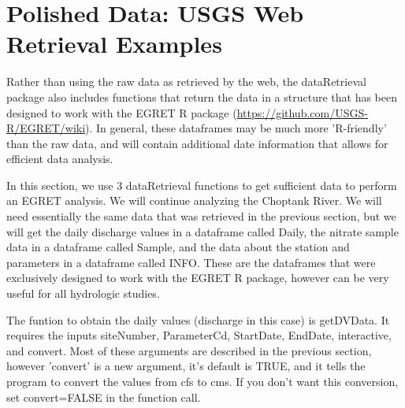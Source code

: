 \documentclass[a4paper,11pt]{article}
\begin{document}
\section{Polished Data: USGS Web Retrieval Examples}
Rather than using the raw data as retrieved by the web, the dataRetrieval package also includes functions that return the data in a structure that has been designed to work with the EGRET R package (\url{https://github.com/USGS-R/EGRET/wiki}). In general, these dataframes may be much more 'R-friendly' than the raw data, and will contain additional date information that allows for efficient data analysis.

In this section, we use 3 dataRetrieval functions to get sufficient data to perform an EGRET analysis.  We will continue analyzing the Choptank River. We will need essentially the same data that was retrieved in the previous section, but we will get the daily discharge values in a dataframe called Daily, the nitrate sample data in a dataframe called Sample, and the data about the station and parameters in a dataframe called INFO. These are the dataframes that were exclusively designed to work with the EGRET R package, however can be very useful for all hydrologic studies.

The funtion to obtain the daily values (discharge in this case) is getDVData.  It requires the inputs siteNumber, ParameterCd, StartDate, EndDate, interactive, and convert. Most of these arguments are described in the previous section, however 'convert' is a new argument, it's default is TRUE, and it tells the program to convert the values from cfs to cms. If you don't want this conversion, set convert=FALSE in the function call.
\end{document}
